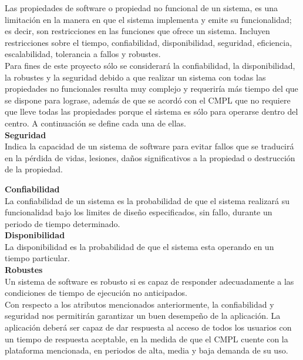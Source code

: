 Las propiedades de software o propiedad no funcional de un sistema, es una limitación en la manera en que el sistema implementa y emite su funcionalidad; es decir, son restricciones en las funciones que ofrece un sistema. Incluyen restricciones sobre el tiempo, confiabilidad, disponibilidad, seguridad, eficiencia, escalabilidad, tolerancia a fallos y robustes. \\

Para fines de este proyecto sólo se considerará la confiabilidad, la disponibilidad, la robustes y la seguridad debido a que realizar un sistema con todas las propiedades no funcionales resulta muy complejo y requeriría más tiempo del que se dispone para lograse, además de que se acordó con el CMPL que no requiere que lleve todas las propiedades porque el sistema es sólo para operarse dentro del centro. A continuación se define cada una de ellas. \\ %

\textbf{Seguridad\\}
Indica la capacidad de un sistema de software para evitar fallos que se traducirá en la pérdida de vidas, lesiones, daños significativos a la propiedad o destrucción de la propiedad\cite{Seguridad}.

\textbf{Confiabilidad\\}
La confiabilidad de un sistema es la probabilidad de que el sistema realizará su funcionalidad bajo los limites de diseño especificados, sin fallo, durante un periodo de tiempo determinado\cite{Seguridad}.\\

\textbf{Disponibilidad\\}
La disponibilidad es la probabilidad de que el sistema esta operando en un tiempo particular\cite{Seguridad}.\\ 

\textbf{Robustes\\}
Un sistema de software es robusto si es capaz de responder adecuadamente a las condiciones de tiempo de ejecución no anticipados\cite{Seguridad}.\\

Con respecto a los atributos mencionados anteriormente, la confiabilidad y seguridad nos permitirán garantizar un buen desempeño de la aplicación. La aplicación deberá ser capaz de dar respuesta al acceso de todos los usuarios con un tiempo de respuesta aceptable, en la medida de que el CMPL cuente con la plataforma mencionada, en periodos de alta, media y baja demanda de su uso.\\


